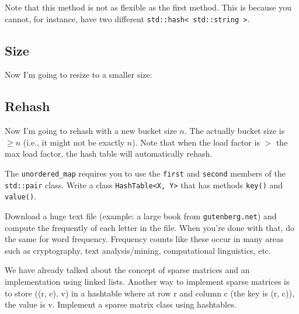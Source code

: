 Note that this method is not as flexible as the first method.
This is because you cannot, for instance, have two different
\verb!std::hash< std::string >!.


\subsection{Size}

Now I'm going to resize to a smaller size:


\vspace{-0.1cm}
{\small
{}
}



\subsection{Rehash}

Now I'm going to rehash with a new bucket size $n$.
The actually bucket size is $\geq n$ (i.e., it might not be exactly $n$).
Note that when the load factor is $>$ the max load factor, the hash table
will automatically rehash.


\vspace{-0.1cm}
{\small
{}
}

\begin{ex}
  The \verb!unordered_map! requires you to use the
  \verb!first! and \verb!second! members of the
  \verb!std::pair! class.
  Write a class \verb!HashTable<X, Y>! that has
  methods \verb!key()! and \verb!value()!.
\end{ex}


\begin{ex}
Download a huge text file (example: a large book from \verb!gutenberg.net!)
and compute the frequently of each letter in the file.
When you're done with that, do the same for word frequency.
Frequency counts like these occur in many areas such as
cryptography, text analysis/mining, computational linguistics, etc.
\end{ex}


\begin{ex}
We have already talked about the concept of sparse matrices and
an implementation using linked lists.
Another way to implement sparse matrices is to store
((r, c), v) in a hashtable
where at row r and column c (the key is (r, c)), the value is v.
Implement a sparse matrix class using hashtables.
\end{ex}


